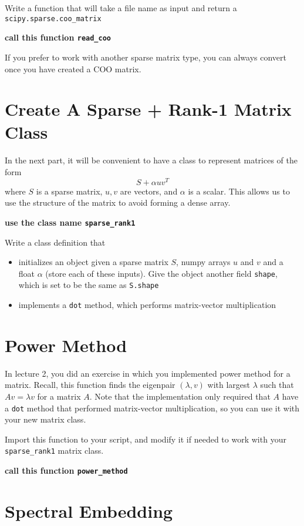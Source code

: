 \documentclass{article}
\begin{document}
Write a function that will take a file name as input and return a {\tt scipy.sparse.coo\_matrix}

{\bf call this function {\tt read\_coo} }

If you prefer to work with another sparse matrix type, you can always convert once you have created a COO matrix.

\section{Create A Sparse + Rank-1 Matrix Class}

In the next part, it will be convenient to have a class to represent matrices of the form
$$ S + \alpha uv^T$$
where $S$ is a sparse matrix, $u, v$ are vectors, and $\alpha$ is a scalar.  This allows us to use the structure of the matrix to avoid forming a dense array.

{\bf use the class name {\tt sparse\_rank1} } 

Write a class definition that
\begin{itemize}
\item initializes an object given a sparse matrix $S$, numpy arrays $u$ and $v$ and a float $\alpha$ (store each of these inputs).  Give the object another field {\tt shape}, which is set to be the same as {\tt S.shape}
\item implements a {\tt dot} method, which performs matrix-vector multiplication
\end{itemize}

\section{Power Method}
In lecture 2, you did an exercise in which you implemented power method for a matrix.  Recall, this function finds the eigenpair $(\lambda, v)$ with largest $\lambda$ such that $Av = \lambda v$ for a matrix $A$.  Note that the implementation only required that $A$ have a {\tt dot} method that performed matrix-vector multiplication, so you can use it with your new matrix class.

Import this function to your script, and modify it if needed to work with your {\tt sparse\_rank1} matrix class.

{\bf call this function {\tt power\_method} }

\section{Spectral Embedding}
\end{document}
